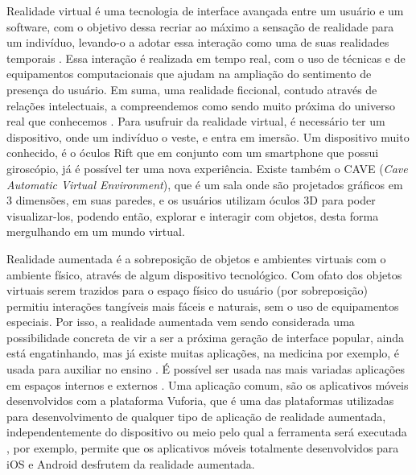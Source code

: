 \documentclass[12pt]{article}
\begin{document}
  \hspace*{5mm}Realidade virtual é uma tecnologia de interface avançada entre um usuário e um software, com o objetivo dessa recriar ao máximo a sensação de realidade para um indivíduo, levando-o a adotar essa interação como uma de suas realidades temporais \cite{livro_IA_BU}. Essa interação é realizada em tempo real, com o uso de técnicas e de equipamentos computacionais que ajudam na ampliação do sentimento de presença do usuário. Em suma, uma realidade ficcional, contudo através de relações intelectuais, a compreendemos como sendo muito próxima do universo real que conhecemos \cite{livro_IA_BU}. Para usufruir da realidade virtual, é necessário ter um dispositivo, onde um indivíduo o veste, e entra em imersão. Um dispositivo muito conhecido, é o óculos Rift que em conjunto com um smartphone que possui giroscópio, já é possível ter uma nova experiência. Existe também o CAVE (\textit{Cave Automatic Virtual Environment}), que é um sala onde são projetados gráficos em 3 dimensões, em suas paredes, e os usuários utilizam óculos 3D para poder visualizar-los, podendo então, explorar e interagir com objetos, desta forma mergulhando em um mundo virtual.\cite{caverna}

Realidade aumentada é a sobreposição de objetos e ambientes virtuais com o ambiente físico, através de algum dispositivo tecnológico. Com ofato dos objetos virtuais serem trazidos para o espaço físico do usuário (por sobreposição) permitiu interações tangíveis mais fáceis e naturais, sem o uso de equipamentos especiais. Por isso, a realidade aumentada vem sendo considerada uma possibilidade concreta de vir a ser a próxima geração de interface popular, ainda está engatinhando, mas já existe muitas aplicações, na medicina por exemplo, é usada para auxiliar no ensino \cite{aplicacoes_VR}. É possível ser usada nas mais variadas aplicações em espaços internos e externos \cite{realidadevirtual_e_realidadeaumentada}. Uma aplicação comum, são os aplicativos móveis desenvolvidos com a plataforma Vuforia, que é uma das plataformas utilizadas para desenvolvimento de qualquer tipo de aplicação de realidade aumentada, independentemente do dispositivo ou meio pelo qual a ferramenta será executada \cite{realidadevirtual_e_realidadeaumentada}, por exemplo, permite que os aplicativos móveis totalmente desenvolvidos para iOS e Android desfrutem da realidade aumentada.\cite{site_vuforia}
\end{document}
